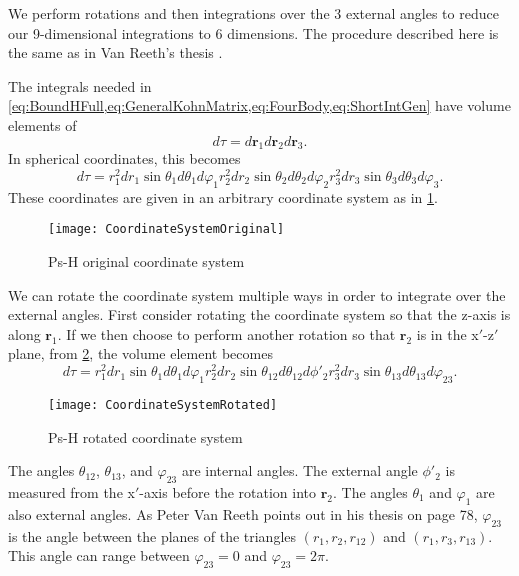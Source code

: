 \documentclass[Dissertation.tex]{subfiles}
\begin{document}
We perform rotations and then integrations over the 3 
external angles to reduce our 9-dimensional integrations to 6 dimensions. The
procedure described here is the same as in Van Reeth's thesis
\cite{VanReethThesis}.

The integrals needed in
\cref{eq:BoundHFull,eq:GeneralKohnMatrix,eq:FourBody,eq:ShortIntGen} have
volume elements of
\begin{equation}
\label{eq:dTau1}
d\tau = d\textbf{r}_1 d\textbf{r}_2 d\textbf{r}_3.
\end{equation}
In spherical coordinates, this becomes
\begin{equation}
\label{eq:dTau2}
d\tau = r_1^2 dr_1 \sin\theta_1 d\theta_1 d\varphi_1 r_2^2 dr_2 \sin\theta_2
  d\theta_2 d\varphi_2 r_3^2 dr_3 \sin\theta_3 d\theta_3 d\varphi_3.
\end{equation}
These coordinates are given in an arbitrary coordinate system as in
\cref{fig:CoordinateSystemOriginal}.

\begin{figure}
	\centering
	\texttt{[image: CoordinateSystemOriginal]}
	\caption{Ps-H original coordinate system}
	\label{fig:CoordinateSystemOriginal}
\end{figure}

We can rotate the coordinate system multiple ways in order to integrate over 
the external angles. First consider rotating the coordinate system so that the
z-axis is along $\textbf{r}_1$. If we then choose to perform another rotation
so that $\textbf{r}_2$ is in the x$'$-z$'$ plane, from
\cref{fig:CoordinateSystemRotated}, the volume element becomes
\begin{equation}
\label{eq:dTau3}
d\tau = r_1^2 dr_1 \sin\theta_1 d\theta_1 d\varphi_1 r_2^2 dr_2 \sin\theta_{12}
  d\theta_{12} d\phi'_2 r_3^2 dr_3 \sin\theta_{13} d\theta_{13} d\varphi_{23}.
\end{equation}
\begin{figure}
	\centering
	\texttt{[image: CoordinateSystemRotated]}
	\caption{Ps-H rotated coordinate system}
	\label{fig:CoordinateSystemRotated}
\end{figure}
\noindent The angles $\theta_{12}$, $\theta_{13}$, and $\varphi_{23}$ are 
internal angles. The external angle $\phi'_2$ is measured from the x$'$-axis 
before the rotation into $\textbf{r}_2$. The angles $\theta_1$ and $\varphi_1$
are also external angles.
As Peter Van Reeth points out in his thesis \cite{VanReethThesis} on page 78, 
$\varphi_{23}$ is the angle between the planes of the triangles
$(r_1,r_2,r_{12})$ and $(r_1,r_3,r_{13})$. This angle can range between
$\varphi_{23} = 0$ and $\varphi_{23} = 2 \pi$.
\end{document}
